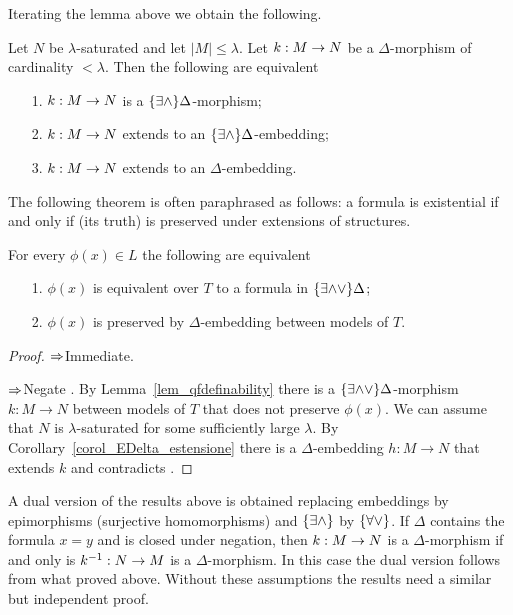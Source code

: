 Iterating the lemma above we obtain the following.

\begin{corollary}\label{corol_EDelta_estensione}
Let $N$ be $\lambda$-saturated and let $|M|\le\lambda$. Let $k:M\rightarrow N$ be a $\Delta$-morphism of cardinality $<\lambda$. Then the following are equivalent
\begin{itemize}
\item[1.] $k:M\rightarrow N$ is a $\{\exists\wedge\}\Delta$-morphism;
\item[2.] $k:M\rightarrow N$ extends to an $\{\exists\wedge\}\Delta$-embedding;
\item[3.] $k:M\rightarrow N$ extends to an $\Delta$-embedding.\QED
\end{itemize}
\end{corollary}

The following theorem is often paraphrased as follows: a formula is existential if and only if (its truth) is preserved under extensions of structures.

\begin{theorem}
For every $\phi(x)\in L$ the following are equivalent
\begin{itemize}
\item[1.] $\phi(x)$ is equivalent over $T$ to a formula in $\{\exists{\wedge}{\vee}\}\Delta$;
\item[2.] $\phi(x)$ is preserved by $\Delta$-embedding between models of $T$.
\end{itemize}
\end{theorem}
\begin{proof}
$\Rightarrow$\quad Immediate. 

$\Rightarrow$\quad Negate . By Lemma~\ref{lem_qfdefinability} there is a $\{\exists{\wedge}{\vee}\}\Delta$-morphism $k:M\to N$ between models of $T$ that does not preserve $\phi(x)$. We can assume that $N$ is $\lambda$-saturated for some sufficiently large $\lambda$. By Corollary~\ref{corol_EDelta_estensione} there is a $\Delta$-embedding $h:M\to N$ that extends $k$ and contradicts .
\end{proof}

A dual version of the results above is obtained replacing embeddings by epimorphisms (surjective homomorphisms) and $\{\exists\wedge\}$ by $\{\forall\vee\}$. If $\Delta$ contains the formula $x=y$ and is closed under negation, then $k:M\rightarrow N$ is a $\Delta$-morphism if and only is $k^{-1}:N\rightarrow M$ is a $\Delta$-morphism. In this case the dual version follows from what proved above. Without these assumptions the results need a similar but independent proof.

